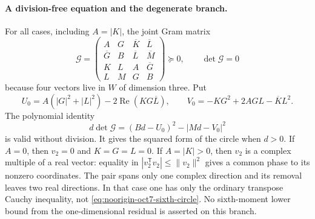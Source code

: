 \documentclass[11pt]{article}
\theoremstyle{remark}
\numberwithin{equation}{section}
\begin{document}
\paragraph{A division-free equation and the degenerate branch.}
For all cases, including $A=|K|$, the joint Gram matrix
\begin{equation}\label{eq:noorigin-oct7-joint-gram}
 \mathcal G=
 \begin{pmatrix}
 A&G&\overline K&\overline L\\
 \overline G&B&\overline L&\overline M\\
 K&L&A&\overline G\\
 L&M&G&B
 \end{pmatrix}
 \succeq0,\qquad \det\mathcal G=0
\end{equation}
because four vectors live in $W$ of dimension three.
Put
\[
 U_0=A(|G|^2+|L|^2)-2\operatorname{Re}(KG\overline L),\qquad
 V_0=-KG^2+2AGL-\overline K L^2.
\]
The polynomial identity
\begin{equation}\label{eq:noorigin-oct7-cleared-rank}
 d\det\mathcal G=(Bd-U_0)^2-|Md-V_0|^2
\end{equation}
is valid without division. It gives the squared form of the circle
when $d>0$. If $A=0$, then $v_2=0$ and $K=G=L=0$.
If $A=|K|>0$, then $v_2$ is a complex multiple of a real vector:
equality in $|v_2^{\mathsf T}v_2|\le\|v_2\|^2$ gives a common
phase to its nonzero coordinates. The pair spans only one complex
direction and its removal leaves two real directions. In that
case one has only the ordinary transpose Cauchy inequality, not
\eqref{eq:noorigin-oct7-sixth-circle}. No sixth-moment lower bound
from the one-dimensional residual is asserted on this branch.
\end{document}
